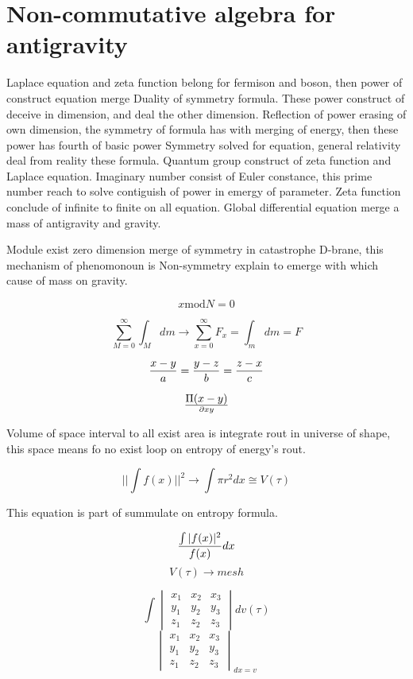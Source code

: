 \documentclass{jsarticle}
\begin{document}
\section{Non-commutative algebra for antigravity}

  Laplace equation and zeta function belong for fermison and boson, then power of construct equation merge
Duality of symmetry formula. These power construct of deceive in dimension, and deal the other dimension. Reflection
of power erasing of own dimension, the symmetry of formula has with merging of energy, then these power has fourth
of basic power Symmetry solved for equation, general relativity deal from reality these formula. Quantum group
construct of zeta function and Laplace equation. Imaginary number consist of Euler constance, this prime number
reach to solve contiguish of power in emergy of parameter. Zeta function conclude of infinite to finite on all
equation. Global differential equation merge a mass of antigravity and gravity.

  Module exist zero dimension merge of symmetry in catastrophe D-brane, this mechanism of phenomonoun
is Non-symmetry explain to emerge with which cause of mass on gravity.

$$x \mathrm{mod} N = 0 $$

$$ \sum^{\infty}_{M=0} \int_M dm \to \sum^{\infty}_{x=0} F_x = \int_m dm = F $$

$$ {x - y \over a } = {y - z \over b} = {z - x \over c} $$

$$ \Pi(x - y) \over \partial xy $$

  Volume of space interval to all exist area is integrate rout in universe of shape, this space means fo
no exist loop on entropy of energy's rout.

$$ || \int f(x) ||^2 \to \int \pi r^2 dx \cong V(\tau) $$

 This equation is part of summulate on entropy formula.

 $$ {\int |f(x)|^2 \over f(x)} dx $$
$$V(\tau) \to mesh $$

 $$ \int \begin{vmatrix} x_1 & x_2 & x_3 \\
    y_1 & y_2 & y_3 \\
    z_1 & z_2 & z_3 \end{vmatrix} dv({\tau}) $$
 $$ \begin{vmatrix} x_1 & x_2 & x_3 \\
    y_1 & y_2 & y_3 \\
    z_1 & z_2 & z_3 \end{vmatrix}_{dx=v}  $$
\end{document}
